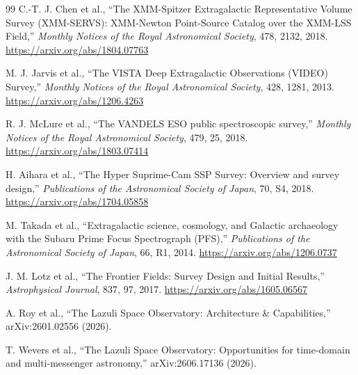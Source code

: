 \begin{thebibliography}{99}
C.-T. J. Chen et al.,
``The XMM-Spitzer Extragalactic Representative Volume Survey (XMM-SERVS): XMM-Newton Point-Source Catalog over the XMM-LSS Field,''
\emph{Monthly Notices of the Royal Astronomical Society}, 478, 2132, 2018.
\url{https://arxiv.org/abs/1804.07763}

M. J. Jarvis et al.,
``The VISTA Deep Extragalactic Observations (VIDEO) Survey,''
\emph{Monthly Notices of the Royal Astronomical Society}, 428, 1281, 2013.
\url{https://arxiv.org/abs/1206.4263}

R. J. McLure et al.,
``The VANDELS ESO public spectroscopic survey,''
\emph{Monthly Notices of the Royal Astronomical Society}, 479, 25, 2018.
\url{https://arxiv.org/abs/1803.07414}

H. Aihara et al.,
``The Hyper Suprime-Cam SSP Survey: Overview and survey design,''
\emph{Publications of the Astronomical Society of Japan}, 70, S4, 2018.
\url{https://arxiv.org/abs/1704.05858}

M. Takada et al.,
``Extragalactic science, cosmology, and Galactic archaeology with the Subaru Prime Focus Spectrograph (PFS),''
\emph{Publications of the Astronomical Society of Japan}, 66, R1, 2014.
\url{https://arxiv.org/abs/1206.0737}

J. M. Lotz et al.,
``The Frontier Fields: Survey Design and Initial Results,''
\emph{Astrophysical Journal}, 837, 97, 2017.
\url{https://arxiv.org/abs/1605.06567}

A. Roy et al.,
``The Lazuli Space Observatory: Architecture \& Capabilities,''
arXiv:2601.02556 (2026).

T. Wevers et al.,
``The Lazuli Space Observatory: Opportunities for time-domain and
multi-messenger astronomy,''
arXiv:2606.17136 (2026).

\end{thebibliography}
